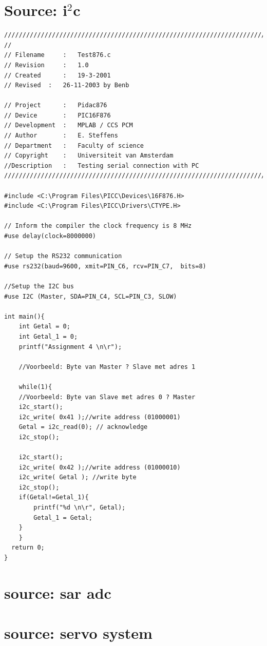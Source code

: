 \documentclass[a4paper, 12pt, titlepage]{article}
\begin{document}
\section{Source: i$^2$c} %
\begin{verbatim}
/////////////////////////////////////////////////////////////////////////
//
// Filename 	:	Test876.c                                            
// Revision 	:	1.0                                                   
// Created  	:	19-3-2001 
// Revised	: 	26-11-2003 by Benb       
                                   
// Project  	:	Pidac876                                              
// Device		:	PIC16F876                                          
// Development	:	MPLAB / CCS PCM                                                        
// Author		:	E. Steffens
// Department	:	Faculty of science
// Copyright	:	Universiteit van Amsterdam
//Description	:	Testing serial connection with PC                        
/////////////////////////////////////////////////////////////////////////

#include <C:\Program Files\PICC\Devices\16F876.H>
#include <C:\Program Files\PICC\Drivers\CTYPE.H>

// Inform the compiler the clock frequency is 8 MHz
#use delay(clock=8000000) 

// Setup the RS232 communication
#use rs232(baud=9600, xmit=PIN_C6, rcv=PIN_C7,  bits=8)

//Setup the I2C bus
#use I2C (Master, SDA=PIN_C4, SCL=PIN_C3, SLOW)

int main(){
	int Getal = 0;
    int Getal_1 = 0;
    printf("Assignment 4 \n\r");

	//Voorbeeld: Byte van Master ? Slave met adres 1

	while(1){
	//Voorbeeld: Byte van Slave met adres 0 ? Master 
	i2c_start();
	i2c_write( 0x41 );//write address (01000001)
	Getal = i2c_read(0); // acknowledge
	i2c_stop();

	i2c_start();
	i2c_write( 0x42 );//write address (01000010)
	i2c_write( Getal );	//write byte
	i2c_stop();
	if(Getal!=Getal_1){
        printf("%d \n\r", Getal);
        Getal_1 = Getal;
    }
    }
  return 0;
}
\end{verbatim}

\section{source: sar adc} %


\section{source: servo system} %

\end{document}
